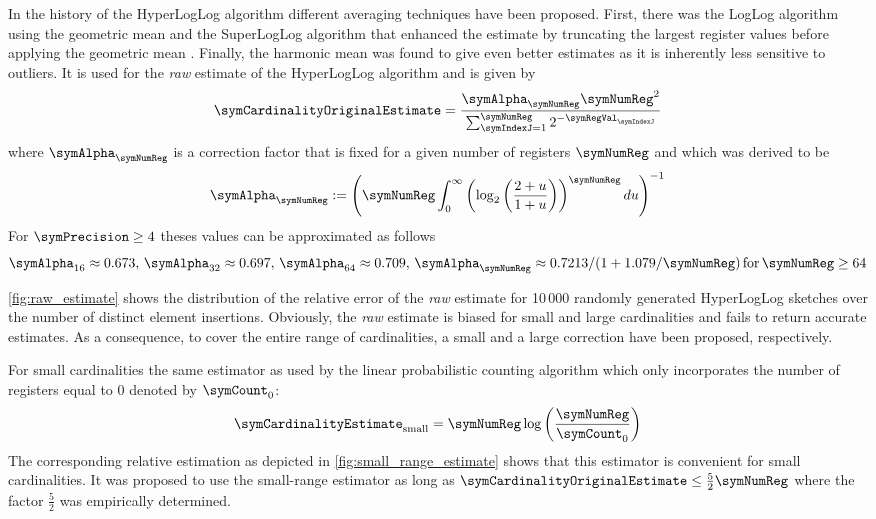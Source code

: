 \documentclass[11pt]{article} %
\begin{document}
In the history of the HyperLogLog algorithm different averaging techniques have been proposed. First, there was the LogLog algorithm using the geometric mean and the SuperLogLog algorithm that enhanced the estimate by truncating the largest register values before applying the geometric mean \cite{Durand2003}. Finally, the harmonic mean was found to give even better estimates as it is inherently less sensitive to outliers. It is used for the \emph{raw} estimate of the HyperLogLog algorithm and is given by
\begin{equation}
\label{equ:intermediate_estimate}
\symCardinalityOriginalEstimate = \frac{\symAlpha_\symNumReg \symNumReg^2}{\sum_{\symIndexJ=1}^{\symNumReg}2^{-\symRegVal_\symIndexJ}}
\end{equation}
where $\symAlpha_\symNumReg$  is a correction factor that is fixed for a given number of registers $\symNumReg$ and which was derived to be \cite{Flajolet2007}
\begin{equation}
\symAlpha_\symNumReg := \left(
\symNumReg
\int_0^\infty
\left(
\log_2\left(
\frac{2+u}{1+u}
\right)
\right)^\symNumReg
du
\right)^{-1}
\end{equation}
For $\symPrecision \geq 4$ theses values can be approximated as follows
\begin{equation}
\symAlpha_{16}\approx 0.673,
\,
\symAlpha_{32}\approx 0.697,
\,
\symAlpha_{64}\approx 0.709,
\,
\symAlpha_\symNumReg\approx 0.7213/(1+1.079/\symNumReg)
\,\text{for}\,\symNumReg\geq 64 
\end{equation}

\autoref{fig:raw_estimate} shows the distribution of the relative error of the \emph{raw} estimate for 10\,000 randomly generated HyperLogLog sketches over the number of distinct element insertions. Obviously, the \emph{raw} estimate is biased for small and large cardinalities and fails to return accurate estimates. As a consequence, to cover the entire range of cardinalities, a small and a large correction have been proposed, respectively.

For small cardinalities the same estimator as used by the linear probabilistic counting algorithm \cite{Whang1990} which only incorporates the number of registers equal to 0 denoted by $\symCount_0$:
\begin{equation}
\label{equ:small_range_estimate}
\symCardinalityEstimate_\text{small} = \symNumReg \log\left(
\frac{\symNumReg}{\symCount_0}
\right)
\end{equation}
The corresponding relative estimation as depicted in \autoref{fig:small_range_estimate} shows that this estimator is convenient for small cardinalities.
It was proposed to use the small-range estimator as long as $\symCardinalityOriginalEstimate \leq \frac{5}{2}\symNumReg$ where the factor $\frac{5}{2}$ was empirically determined. 
\end{document}
